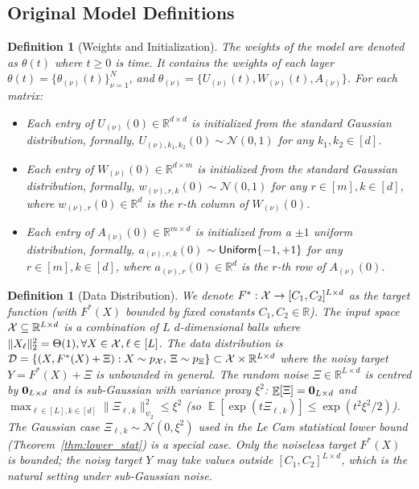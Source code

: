 \documentclass[11pt]{article}
\theoremstyle{plain}
\newtheorem{definition}[theorem]{Definition}
\newcommand{\R}{\mathbb{R}}
\DeclareMathOperator*{\E}{{\mathbb{E}}}
\begin{document}
\subsection{Original Model Definitions}


\begin{definition}[Weights and Initialization]
    The weights of the model are denoted as $\theta(t)$ where $t\ge 0$ is time. It contains the weights of each layer $\theta(t) = \{\theta_{(\nu)}(t)\}_{\nu=1}^N$, and $\theta_{(\nu)} = \{ U_{(\nu)}(t), W_{(\nu)}(t), A_{(\nu)} \}$. For each matrix:
    \begin{itemize}
        \item Each entry of $U_{(\nu)}(0) \in \R^{d \times d}$ is initialized from the standard Gaussian distribution, formally, $U_{(\nu), k_1, k_2}(0) \sim \mathcal{N}(0, 1)$ for any $k_1, k_2 \in [d]$.
        \item Each entry of $W_{(\nu)}(0) \in \R^{d \times m}$ is initialized from the standard Gaussian distribution, formally, $w_{(\nu), r, k}(0) \sim \mathcal{N}(0, 1)$ for any $r \in [m], k \in [d]$, where $w_{(\nu), r}(0) \in \R^d$ is the $r$-th column of $W_{(\nu)}(0)$.
        \item Each entry of $A_{(\nu)}(0) \in \R^{m \times d}$ is initialized from a $\pm 1$ uniform distribution, formally, $a_{(\nu), r, k}(0) $ $\sim {\sf Uniform}\{-1, +1\}$ for any $r \in [m], k \in [d]$, where $a_{(\nu), r}(0) \in \R^d$ is the $r$-th row of $A_{(\nu)}(0)$.
    \end{itemize}
\end{definition}

\begin{definition}[Data Distribution]
    We denote $F^*: {\cal X} \to [C_1, C_2]^{L \times d}$ as the target function (with $F^*(X)$ bounded by fixed constants $C_1, C_2\in\R$). The input space ${\cal X} \subseteq \R^{L \times d}$ is a combination of $L$ $d$-dimensional balls where $\|X_\ell\|_2^2 = \Theta(1), \forall X\in {\cal X}, \ell \in [L]$. The data distribution is ${\cal D} = \{(X, F^*(X)+\Xi) : X\sim p_{\cal X},\, \Xi\sim p_\Xi\} \subset {\cal X} \times \R^{L\times d}$ where the noisy target $Y = F^*(X)+\Xi$ is unbounded in general. The random noise $\Xi \in \R^{L \times d}$ is centred by ${\bf 0}_{L \times d}$ and is sub-Gaussian with variance proxy $\xi^2$: $\E[\Xi] = {\bf 0}_{L\times d}$ and $\max_{\ell\in[L], k\in[d]} \|\Xi_{\ell,k}\|_{\psi_2}^2 \leq \xi^2$ (so $\E[\exp(t\Xi_{\ell,k})] \le \exp(t^2\xi^2/2)$). The Gaussian case $\Xi_{\ell,k}\sim\mathcal{N}(0,\xi^2)$ used in the Le Cam statistical lower bound (Theorem~\ref{thm:lower_stat}) is a special case. Only the noiseless target $F^*(X)$ is bounded; the noisy target $Y$ may take values outside $[C_1, C_2]^{L\times d}$, which is the natural setting under sub-Gaussian noise.
\end{definition}
\end{document}
